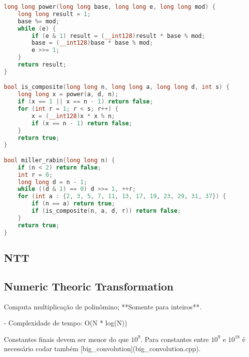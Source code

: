 \documentclass[11pt, a4paper, twoside]{article}
\begin{document}
\begin{lstlisting}[language=C++]
long long power(long long base, long long e, long long mod) {
    long long result = 1;
    base %= mod;
    while (e) {
        if (e & 1) result = (__int128)result * base % mod;
        base = (__int128)base * base % mod;
        e >>= 1;
    }
    return result;
}

bool is_composite(long long n, long long a, long long d, int s) {
    long long x = power(a, d, n);
    if (x == 1 || x == n - 1) return false;
    for (int r = 1; r < s; r++) {
        x = (__int128)x * x % n;
        if (x == n - 1) return false;
    }
    return true;
}

bool miller_rabin(long long n) {
    if (n < 2) return false;
    int r = 0;
    long long d = n - 1;
    while ((d & 1) == 0) d >>= 1, ++r;
    for (int a : {2, 3, 5, 7, 11, 13, 17, 19, 23, 29, 31, 37}) {
        if (n == a) return true;
        if (is_composite(n, a, d, r)) return false;
    }
    return true;
}
\end{lstlisting}

\subsection{NTT}

\subsection{Numeric Theoric Transformation}



Computa multiplicação de polinômino; **Somente para inteiros**.

- Complexidade de tempo: O(N * log(N))

Constantes finais devem ser menor do que $10^9$.  
Para constantes entre $10^9$ e $10^{18}$ é necessário codar também [big\_convolution](big\_convolution.cpp).
\end{document}
